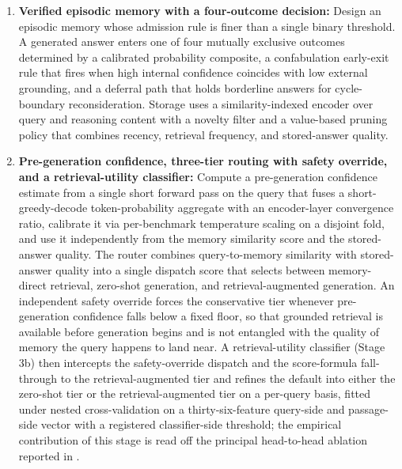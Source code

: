 \begin{enumerate}
\item \textbf{Verified episodic memory with a four-outcome decision:} Design an episodic memory whose admission rule is finer than a single binary threshold. A generated answer enters one of four mutually exclusive outcomes determined by a calibrated probability composite, a confabulation early-exit rule that fires when high internal confidence coincides with low external grounding, and a deferral path that holds borderline answers for cycle-boundary reconsideration. Storage uses a similarity-indexed encoder over query and reasoning content with a novelty filter and a value-based pruning policy that combines recency, retrieval frequency, and stored-answer quality.

\item \textbf{Pre-generation confidence, three-tier routing with safety override, and a retrieval-utility classifier:} Compute a pre-generation confidence estimate from a single short forward pass on the query that fuses a short-greedy-decode token-probability aggregate with an encoder-layer convergence ratio, calibrate it via per-benchmark temperature scaling on a disjoint fold, and use it independently from the memory similarity score and the stored-answer quality. The router combines query-to-memory similarity with stored-answer quality into a single dispatch score that selects between memory-direct retrieval, zero-shot generation, and retrieval-augmented generation. An independent safety override forces the conservative tier whenever pre-generation confidence falls below a fixed floor, so that grounded retrieval is available before generation begins and is not entangled with the quality of memory the query happens to land near. A retrieval-utility classifier (Stage 3b) then intercepts the safety-override dispatch and the score-formula fall-through to the retrieval-augmented tier and refines the default into either the zero-shot tier or the retrieval-augmented tier on a per-query basis, fitted under nested cross-validation on a thirty-six-feature query-side and passage-side vector with a registered classifier-side threshold; the empirical contribution of this stage is read off the principal head-to-head ablation reported in .


\end{enumerate}
